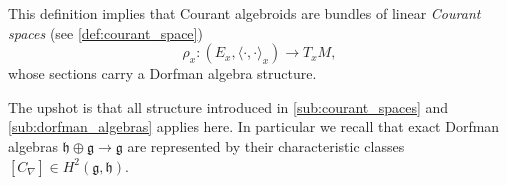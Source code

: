 This definition implies that Courant algebroids are bundles of linear \textit{Courant spaces} (see \cref{def:courant_space})
\begin{equation}
    \rho_x : (E_x, \langle \cdot,\cdot \rangle_x) \rightarrow T_xM,
\end{equation}
whose sections carry a Dorfman algebra structure.

% 
\label{def:Exact Courant algebroid}
% 
The upshot is that all structure introduced in \cref{sub:courant_spaces} and \cref{sub:dorfman_algebras} applies here. 
In particular we recall that exact Dorfman algebras $\mathfrak{h} \oplus \mathfrak{g}  \rightarrow \mathfrak{g}$ are represented by their characteristic classes $[C_\nabla] \in H^2(\mathfrak{g,h})$.

